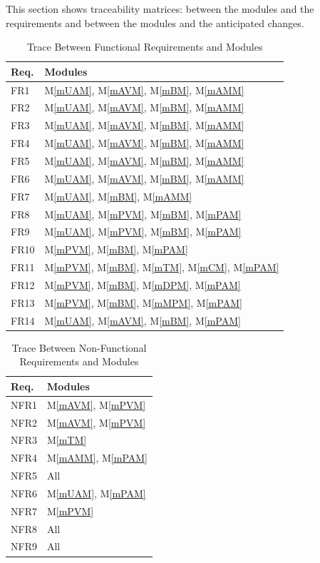 \documentclass[12pt, titlepage]{article}
\newcommand{\mref}[1]{M\ref{#1}}
\begin{document}
This section shows traceability matrices: between the modules and the requirements and between the modules and the anticipated changes.

\begin{table}[H]
\centering
\begin{tabular}{p{} p{}}
\toprule
\textbf{Req.} & \textbf{Modules}\\
\midrule
FR1 & \mref{mUAM}, \mref{mAVM}, \mref{mBM}, \mref{mAMM}\\
FR2 & \mref{mUAM}, \mref{mAVM}, \mref{mBM}, \mref{mAMM}\\
FR3 & \mref{mUAM}, \mref{mAVM}, \mref{mBM}, \mref{mAMM}\\
FR4 & \mref{mUAM}, \mref{mAVM}, \mref{mBM}, \mref{mAMM}\\
FR5 & \mref{mUAM}, \mref{mAVM}, \mref{mBM}, \mref{mAMM}\\
FR6 & \mref{mUAM}, \mref{mAVM}, \mref{mBM}, \mref{mAMM}\\
FR7 & \mref{mUAM}, \mref{mBM}, \mref{mAMM}\\
FR8 & \mref{mUAM}, \mref{mPVM}, \mref{mBM}, \mref{mPAM}\\
FR9 & \mref{mUAM}, \mref{mPVM}, \mref{mBM}, \mref{mPAM}\\
FR10 & \mref{mPVM}, \mref{mBM}, \mref{mPAM}\\
FR11 & \mref{mPVM}, \mref{mBM}, \mref{mTM}, \mref{mCM}, \mref{mPAM}\\
FR12 & \mref{mPVM}, \mref{mBM}, \mref{mDPM}, \mref{mPAM}\\
FR13 & \mref{mPVM}, \mref{mBM}, \mref{mMPM}, \mref{mPAM}\\
FR14 & \mref{mUAM}, \mref{mAVM}, \mref{mBM}, \mref{mPAM}\\
\bottomrule
\end{tabular}
\caption{Trace Between Functional Requirements and Modules}
\label{TblRT}
\end{table}

\begin{table}[H]
\centering
\begin{tabular}{p{} p{}}
\toprule
\textbf{Req.} & \textbf{Modules}\\
\midrule
NFR1 & \mref{mAVM}, \mref{mPVM}\\
NFR2 & \mref{mAVM}, \mref{mPVM}\\
NFR3 & \mref{mTM}\\
NFR4 & \mref{mAMM}, \mref{mPAM}\\
NFR5 & All \\
NFR6 & \mref{mUAM}, \mref{mPAM}\\
NFR7 & \mref{mPVM}\\
NFR8 & All \\
NFR9 & All \\
\bottomrule
\end{tabular}
\caption{Trace Between Non-Functional Requirements and Modules}
\label{TblRT}
\end{table}
\end{document}
